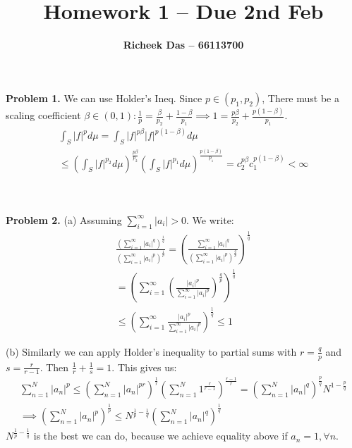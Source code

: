 \documentclass{article}
\title{Homework 1 --  Due 2nd Feb}
\author{\textbf{Richeek Das -- 66113700}}
\begin{document}
\maketitle

\textbf{Problem 1. } We can use Holder's Ineq. Since $p \in (p_1, p_2)$, There must be a scaling coefficient $\beta \in (0, 1): \frac{1}{p} = \frac{\beta}{p_2} + \frac{1- \beta}{p_1} \implies 1 = \frac{p\beta}{p_2} + \frac{p(1- \beta)}{p_1}$.
\begin{gather*}
    \int_S |f|^p d\mu = \int_S |f|^{p\beta} |f|^{p(1-\beta)}d\mu\\
    \leq \left( \int_S|f|^{p_2}d\mu \right)^{\frac{p\beta}{p_2}} \left( \int_S |f|^{p_1} d\mu \right)^{\frac{p(1-\beta)}{p_1}} = c_2^{p\beta} c_1^{p(1-\beta)} < \infty
\end{gather*}
\\~

\textbf{Problem 2. } (a) Assuming $\sum_{i=1}^{\infty} |a_i| > 0$. We write:
\begin{gather*}
    \frac{\left(\sum_{i=1}^{\infty} |a_i|^q \right)^{\frac{1}{q}}}{\left(\sum_{i=1}^{\infty} |a_i|^p \right)^{\frac{1}{p}}} = \left( \frac{\sum_{i=1}^{\infty} |a_i|^q }{\left(\sum_{i=1}^{\infty} |a_i|^p \right)^{\frac{q}{p}}} \right)^{\frac{1}{q}}\\
    = \left( \sum_{i=1}^{\infty} \left( \frac{ |a_i|^p }{\sum_{i=1}^{\infty} |a_i|^p} \right)^{\frac{q}{p}} \right)^{\frac{1}{q}} \\
    \leq \left( \sum_{i=1}^{\infty} \frac{ |a_i|^p }{\sum_{i=1}^{\infty} |a_i|^p} \right)^{\frac{1}{q}} \leq 1
\end{gather*}

(b) Similarly we can apply Holder's inequality to partial sums with $r = \frac{q}{p}$ and $s = \frac{r}{r-1}$. Then $\frac{1}{r} + \frac{1}{s} = 1$. This gives us:
\begin{gather*}
    \sum_{n=1}^{N} |a_n|^p \leq \left( \sum_{n=1}^{N} |a_n|^{pr} \right)^{\frac{1}{r}} \left( \sum_{n=1}^N 1^{\frac{r}{r-1}} \right)^{\frac{r-1}{r}} = \left( \sum_{n=1}^{N} |a_n|^{q} \right)^{\frac{p}{q}}N^{1 - \frac{p}{q}}\\
    \implies \left( \sum_{n=1}^{N} |a_n|^p \right)^{\frac{1}{p}} \leq N^{\frac{1}{p} - \frac{1}{q}} \left( \sum_{n=1}^{N} |a_n|^{q} \right)^{\frac{1}{q}}
\end{gather*}
$N^{\frac{1}{p} - \frac{1}{q}}$ is the best we can do, because we achieve equality above if $a_n = 1, \forall n$.
\\~
\end{document}
